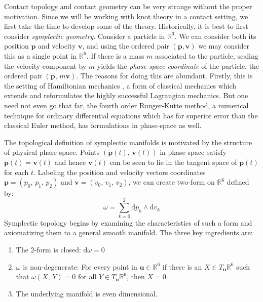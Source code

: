 Contact topology and contact geometry can be very strange without the
proper motivation. Since we will be working with knot theory in a contact
setting, we first take the time to develop some of the theory. Historically, it
is best to first consider \textit{symplectic geometry}. Consider a particle
in $\mathbb{R}^{3}$. We can consider both its position $\mathbf{p}$ and
velocity $\mathbf{v}$, and using the ordered pair $(\mathbf{p},\mathbf{v})$
we may consider this as a single point in $\mathbb{R}^{6}$. If there is a mass
$m$ associated to the particle, scaling the velocity component by $m$ yields
the \textit{phase-space coordinate} of the particle, the ordered pair
$(\mathbf{p},\,m\mathbf{v})$. The reasons for doing this are abundant. Firstly,
this is the setting of Hamiltonian mechanics
\cite{HamiltonMechanics1833}, a form of classical mechanics which extends and
reformulates the highly successful Lagrangian mechanics. But one need not even
go that far, the fourth order Runger-Kutte method, a numerical technique for
ordinary differential equations which has far superior error than the classical
Euler method, has formulations in phase-space as well.
\par\hfill\par
The topological definition of symplectic manifolds is motivated by the
structure of physical phase-space. Points $(\mathbf{p}(t),\,\mathbf{v}(t))$ in
phase-space satisfy $\dot{\mathbf{p}}(t)=\mathbf{v}(t)$ and hence
$\mathbf{v}(t)$ can be seen to lie in the tangent space of $\mathbf{p}(t)$ for
each $t$. Labeling the position and velocity vectors
coordinates $\mathbf{p}=(p_{0},\,p_{1},\,p_{2})$ and
$\mathbf{v}=(v_{0},\,v_{1},\,v_{2})$, we can create two-form on
$\mathbb{R}^{6}$ defined by:
\begin{equation}
    \label{eqn:symplectic_louiville_form}
    \omega=\sum_{k=0}^{2}\textrm{d}p_{k}\land\textrm{d}v_{k}
\end{equation}
Symplectic topology begins by examining the characteristics of such a form
and axiomatizing them to a general smooth manifold. The three key ingredients
are:
\begin{enumerate}
    \item The 2-form is closed: $\textrm{d}\omega=0$
    \item $\omega$ is non-degenerate: For every point in
        $\mathbf{u}\in\mathbb{R}^{6}$ if there is an
        $X\in{T}_{\mathbf{u}}\mathbb{R}^{6}$ such that
        $\omega(X,\,Y)=0$ for all $Y\in{T}_{\mathbf{u}}\mathbb{R}^{6}$, then
        $X=0$.
    \item The underlying manifold is even dimensional.
\end{enumerate}
